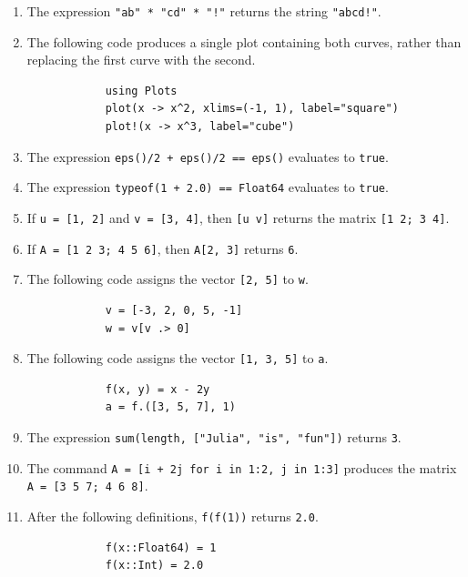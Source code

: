 \documentclass[a4paper]{article}
\newcommand{\julia}[1]{\texttt{#1}}
\begin{document}
\begin{enumerate}[itemsep=8pt]
    \item
        The expression \julia{"ab" * "cd" * "!"} returns the string \julia{"abcd!"}.

    \item
        The following code produces a single plot containing both curves,
        rather than replacing the first curve with the second.
        \begin{verbatim}
            using Plots
            plot(x -> x^2, xlims=(-1, 1), label="square")
            plot!(x -> x^3, label="cube")
        \end{verbatim}

    \item
        The expression \julia{eps()/2 + eps()/2 == eps()} evaluates to \julia{true}.

    \item
        The expression \julia{typeof(1 + 2.0) == Float64} evaluates to \julia{true}.

    \item
        If \julia{u = [1, 2]} and \julia{v = [3, 4]}, then \julia{[u v]}
        returns the matrix \julia{[1 2; 3 4]}.

    \item
        If \julia{A = [1 2 3; 4 5 6]}, then \julia{A[2, 3]} returns \julia{6}.

    \item
        The following code assigns the vector \julia{[2, 5]} to \julia{w}.
        \begin{verbatim}
            v = [-3, 2, 0, 5, -1]
            w = v[v .> 0]
        \end{verbatim}

    \item
        The following code assigns the vector \julia{[1, 3, 5]} to \julia{a}.
        \begin{verbatim}
            f(x, y) = x - 2y
            a = f.([3, 5, 7], 1)
        \end{verbatim}

    \item
        The expression \julia{sum(length, ["Julia", "is", "fun"])} returns \julia{3}.

    \item
        The command \julia{A = [i + 2j for i in 1:2, j in 1:3]}
        produces the matrix \julia{A = [3 5 7; 4 6 8]}.

    \item
        After the following definitions, \julia{f(f(1))} returns \julia{2.0}.
        \begin{verbatim}
            f(x::Float64) = 1
            f(x::Int) = 2.0
        \end{verbatim}
\end{enumerate}
\end{document}
